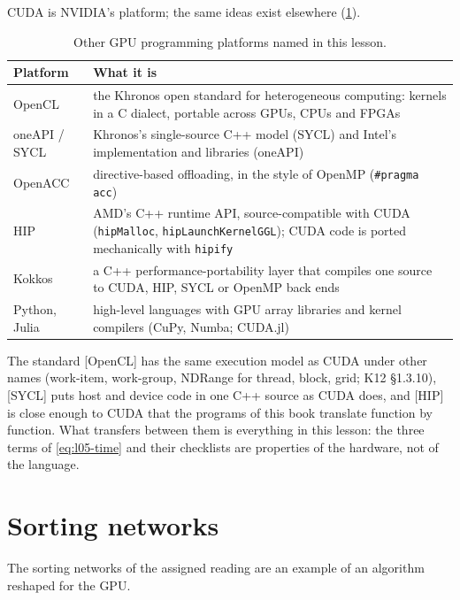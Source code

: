 \documentclass[../main.tex]{subfiles}
\begin{document}
CUDA is NVIDIA's platform; the same ideas exist elsewhere
(\cref{tab:l05-platforms}).

\begin{table}[tb]
  \centering
  \small
  \caption{Other GPU programming platforms named in this lesson.}
  \label{tab:l05-platforms}
  \begin{tabular}{>{\raggedright\arraybackslash}p{22mm}
                  >{\raggedright\arraybackslash}p{84mm}}
    \toprule
    Platform & What it is \\
    \midrule
    OpenCL & the Khronos open standard for heterogeneous computing:
      kernels in a C dialect, portable across GPUs, CPUs and FPGAs \\
    oneAPI / SYCL & Khronos's single-source C++ model (SYCL) and Intel's
      implementation and libraries (oneAPI) \\
    OpenACC & directive-based offloading, in the style of OpenMP
      (\texttt{\#pragma acc}) \\
    HIP & AMD's C++ runtime API, source-compatible with CUDA
      (\texttt{hipMalloc}, \texttt{hipLaunchKernelGGL}); CUDA code is
      ported mechanically with \texttt{hipify} \\
    Kokkos & a C++ performance-portability layer that compiles one
      source to CUDA, HIP, SYCL or OpenMP back ends \\
    Python, Julia & high-level languages with GPU array libraries and
      kernel compilers (CuPy, Numba; CUDA.jl) \\
    \bottomrule
  \end{tabular}
\end{table}

The standard [OpenCL] has the same execution model as CUDA under other
names (work-item, work-group, NDRange for thread, block, grid; K12
§1.3.10), [SYCL] puts host and device code in one C++ source
as CUDA does, and [HIP] is close enough to CUDA that the
programs of this book translate function by function.  What transfers
between them is everything in this lesson: the three terms of
\cref{eq:l05-time} and their checklists are properties of the hardware,
not of the language.

\section{Sorting networks}
\label{sec:l05-sorting}

The sorting networks of the assigned reading \cite{kipfer2005gpusort}
are an example of an algorithm reshaped for the GPU.
\end{document}
